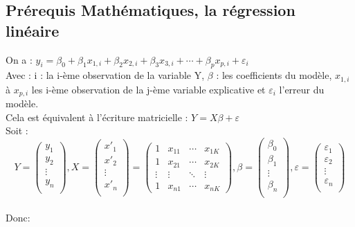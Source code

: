\documentclass[a4paper, 11pt]{article}
\begin{document}
\subsection{Prérequis Mathématiques, la régression linéaire}
On a : $y_i = \beta_0 + \beta_{1}x_{1,i} + \beta_{2}x_{2,i} + \beta_{3}x_{3,i} + \cdots + \beta_{p}x_{p,i} + \varepsilon_i$
\\
Avec : i : la i-ème observation de la variable Y, $\beta$ : les coefficients du modèle, $x_{1,i}$ à $x_{p,i}$ les i-ème observation de la j-ème variable explicative et $\varepsilon_i$ l'erreur du modèle.
\\
Cela est équivalent à l'écriture matricielle : $Y = X\beta + \varepsilon$
\\ Soit :
\[
Y =
\begin{pmatrix}
y_1 \\
y_2 \\
\vdots \\
y_n \\
\end{pmatrix}
, X =
\begin{pmatrix}
x'_1\\
x'_2\\
\vdots \\
x'_n\\
\end{pmatrix}
=
\begin{pmatrix}
1 & x_11 & \cdots & x_{1K} \\
1 & x_21 & \cdots & x_{2K} \\
\vdots & \vdots & \ddots & \vdots \\
1 & x_{n1} & \cdots & x_{nK}
\end{pmatrix}
, \beta =
\begin{pmatrix}
\beta_0\\
\beta_1\\
\vdots \\
\beta_n\\
\end{pmatrix}
, \varepsilon =
\begin{pmatrix}
\varepsilon_1\\
\varepsilon_2\\
\vdots \\
\varepsilon_n\\
\end{pmatrix}
\]
\\
Donc:
\end{document}
